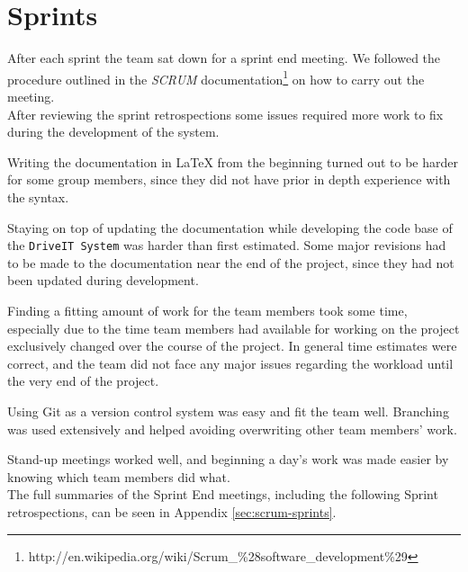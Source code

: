 \section{Sprints}
After each sprint the team sat down for a sprint end meeting. We followed the procedure outlined in the \textit{SCRUM} documentation\footnote{http://en.wikipedia.org/wiki/Scrum\_\%28software\_development\%29} on how to carry out the meeting.\\

After reviewing the sprint retrospections some issues required more work to fix during the development of the system.

Writing the documentation in LaTeX from the beginning turned out to be harder for some group members, since they did not have prior in depth experience with the syntax. 

Staying on top of updating the documentation while developing the code base of the \texttt{DriveIT System} was harder than first estimated. Some major revisions had to be made to the documentation near the end of the project, since they had not been updated during development.

Finding a fitting amount of work for the team members took some time, especially due to the time team members had available for working on the project exclusively changed over the course of the project. In general time estimates were correct, and the team did not face any major issues regarding the workload until the very end of the project.

Using Git as a version control system was easy and fit the team well. Branching was used extensively and helped avoiding overwriting other team members' work. 

Stand-up meetings worked well, and beginning a day's work was made easier by knowing which team members did what. \\

The full summaries of the Sprint End meetings, including the following Sprint retrospections, can be seen in Appendix \ref{sec:scrum-sprints}.
